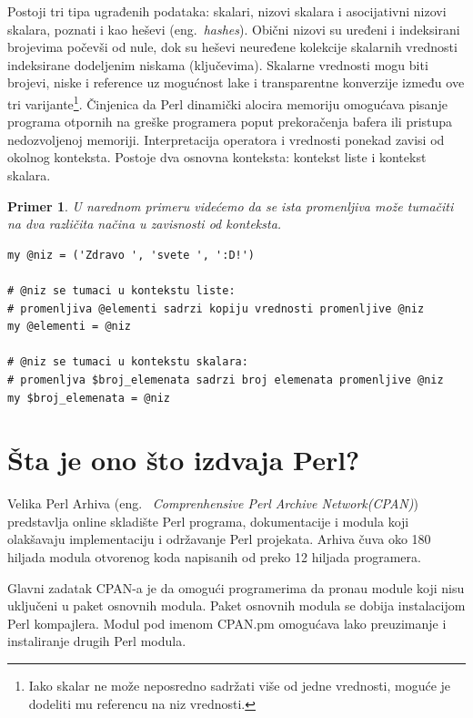 \documentclass[a4paper]{article}
\newtheorem{primer}{Primer}[section]
\begin{document}
Postoji tri tipa ugrađenih podataka: skalari, nizovi skalara i asocijativni nizovi skalara, poznati i kao heševi (eng.~{\em hashes}). Obični nizovi su uređeni i indeksirani brojevima počevši od nule, dok su heševi neuređene kolekcije skalarnih vrednosti indeksirane dodeljenim niskama (ključevima). Skalarne vrednosti mogu biti brojevi, niske i reference uz mogućnost lake i transparentne konverzije između ove tri varijante\footnote{Iako skalar ne može neposredno sadržati više od jedne vrednosti, moguće je dodeliti mu referencu na niz vrednosti.}. Činjenica da Perl dinamički alocira memoriju omogućava pisanje programa otpornih na greške programera poput prekoračenja bafera ili pristupa nedozvoljenoj memoriji. Interpretacija operatora i vrednosti ponekad zavisi od okolnog konteksta. Postoje dva osnovna konteksta: kontekst liste i kontekst skalara\cite{perldoc}.
\begin{primer}
U narednom primeru videćemo da se ista promenljiva može tumačiti na dva različita načina u zavisnosti od konteksta. 
\end{primer}
\begin{lstlisting}[label = kontekst]
my @niz = ('Zdravo ', 'svete ', ':D!')    

# @niz se tumaci u kontekstu liste:
# promenljiva @elementi sadrzi kopiju vrednosti promenljive @niz
my @elementi = @niz        

# @niz se tumaci u kontekstu skalara:
# promenljva $broj_elemenata sadrzi broj elemenata promenljive @niz
my $broj_elemenata = @niz
\end{lstlisting} 

\section{\v Sta je ono što izdvaja Perl?}

Velika Perl Arhiva\cite{cpan} (eng. ~{\em Comprenhensive Perl Archive Network(CPAN)}) 
 predstavlja online skladište Perl programa, dokumentacije i modula koji olakšavaju implementaciju i održavanje Perl projekata. Arhiva čuva oko 180 hiljada modula otvorenog koda napisanih od preko 12 hiljada 
 programera.

Glavni zadatak CPAN-a je da omogu\'ci programerima da prona\dj{}u module koji nisu uklju\v ceni u paket osnovnih modula. Paket osnovnih modula se dobija instalacijom Perl kompajlera. %
Modul pod imenom CPAN.pm omogućava lako preuzimanje i instaliranje drugih Perl modula. 
\end{document}
